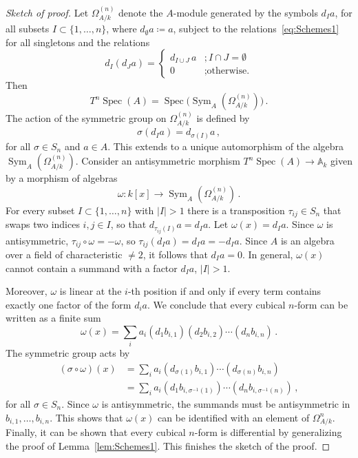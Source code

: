 \documentclass[12pt,reqno, a4paper]{amsart}
\numberwithin{equation}{section}
\theoremstyle{plain}
\theoremstyle{definition}
\theoremstyle{remark}
\newcommand{\bbA}{\mathbb{A}}
\DeclareMathOperator{\Sym}{Sym}
\DeclareMathOperator{\Spec}{Spec}
\begin{document}
\begin{proof}[Sketch of proof]
Let $\Omega^{(n)}_{A/k}$ denote the $A$-module generated by the symbols $d_I a$, for all subsets $I \subset \{ 1, \ldots, n\}$, where $d_\emptyset a \coloneqq a$, subject to the relations~\eqref{eq:Schemes1} for all singletons and the relations
\begin{equation*}
  d_I (d_J a)
  =
  \begin{cases}
    d_{I \cup J}\, a &; I \cap J = \emptyset \\
    0 &; \text{otherwise.}
  \end{cases}
\end{equation*}
Then
\begin{equation*}
  T^n \Spec(A) =  \Spec\bigl( \Sym_A(\Omega^{(n)}_{A/k}) \bigr)
  \,.
\end{equation*}
The action of the symmetric group on $\Omega^{(n)}_{A/k}$ is defined by
\begin{equation*}
  \sigma (d_I a) = d_{\sigma(I)} a
  \,,
\end{equation*}
for all $\sigma \in S_n$ and $a \in A$. This extends to a unique automorphism of the algebra $\Sym_A(\Omega^{(n)}_{A/k})$. Consider an antisymmetric morphism $T^n \Spec(A) \to \bbA_k$ given by a morphism of algebras
\begin{equation*}
  \omega: k[x] \longrightarrow \Sym_A(\Omega^{(n)}_{A/k})
  \,.
\end{equation*}
For every subset $I \subset \{1, \ldots, n\}$ with $|I| > 1$ there is a transposition $\tau_{ij} \in S_n$ that swaps two indices $i,j \in I$, so that $d_{\tau_{ij}(I)} a = d_I a$. Let $\omega(x) = d_I a$. Since $\omega$ is antisymmetric, $\tau_{ij} \circ \omega = - \omega$, so $\tau_{ij} (d_I a) = d_I a = - d_I a$. Since $A$ is an algebra over a field of characteristic $\neq 2$, it follows that $d_I a = 0$. In general, $\omega(x)$ cannot contain a summand with a factor $d_I a$, $|I| > 1$.

Moreover, $\omega$ is linear at the $i$-th position if and only if every term contains exactly one factor of the form $d_i a$. We conclude that every cubical $n$-form can be written as a finite sum
\begin{equation*}
  \omega(x) = \sum_i a_i (d_1 b_{i,1})(d_2 b_{i,2}) \cdots (d_n b_{i,n})
  \,.
\end{equation*}
The symmetric group acts by
\begin{equation*}
\begin{split}
  (\sigma\circ \omega)(x)
  &= \sum_i a_i (d_{\sigma(1)} b_{i,1}) \cdots (d_{\sigma(n)} b_{i,n})
  \\
  &= \sum_i a_i (d_1 b_{i,\sigma^{-1}(1)}) \cdots
  (d_n b_{i,\sigma^{-1}(n)})
  \,,
\end{split}
\end{equation*}
for all $\sigma \in S_n$. Since $\omega$ is antisymmetric, the summands must be antisymmetric in $b_{i,1}, \ldots, b_{i,n}$. This shows that $\omega(x)$ can be identified with an element of $\Omega^n_{A/k}$. Finally, it can be shown that every cubical $n$-form is differential by generalizing the proof of Lemma~\ref{lem:Schemes1}. This finishes the sketch of the proof.
\end{proof}
\end{document}

